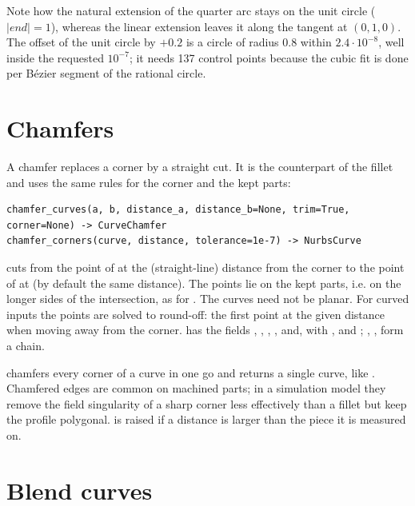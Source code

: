 Note how the natural extension of the quarter arc stays on the unit circle ($|end| = 1$),
whereas the linear extension leaves it along the tangent at $(0,1,0)$. The offset of the unit
circle by $+0.2$ is a circle of radius 0.8 within $2.4\cdot10^{-8}$, well inside the requested
$10^{-7}$; it needs 137 control points because the cubic fit is done per Bézier segment of the
rational circle.

\section{Chamfers}\label{sec:chamfers}

A chamfer replaces a corner by a straight cut. It is the counterpart of the fillet and uses the
same rules for the corner and the kept parts:

\begin{lstlisting}[style=text]
chamfer_curves(a, b, distance_a, distance_b=None, trim=True, corner=None) -> CurveChamfer
chamfer_corners(curve, distance, tolerance=1e-7) -> NurbsCurve
\end{lstlisting}

 cuts from the point of  at the (straight-line) distance
 from the corner to the point of  at  (by default the
same distance). The points lie on the kept parts, i.e. on the longer sides of the
intersection, as for . The curves need not be planar. For curved inputs
the points are solved to round-off: the first point at the given distance when moving away from
the corner.  has the fields , , ,
,  and, with ,  and ;
, ,  form a chain.

 chamfers every corner of a curve in one go and returns a single curve,
like . Chamfered edges are common on machined parts; in a simulation
model they remove the field singularity of a sharp corner less effectively than a fillet but keep
the profile polygonal.  is raised if a distance is larger than the piece it
is measured on.

\section{Blend curves}\label{sec:blend}

